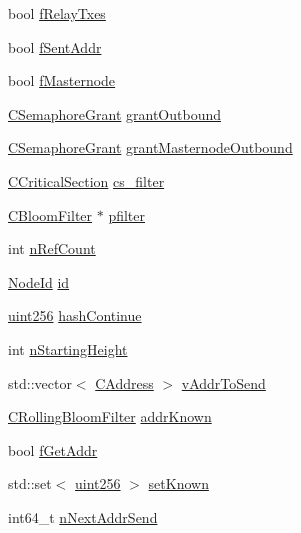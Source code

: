 \begin{DoxyCompactItemize}
bool \mbox{\hyperlink{class_c_node_ab387bb0c4ffd42e3f0aea233dca0e301}{f\+Relay\+Txes}}
\item 
bool \mbox{\hyperlink{class_c_node_aa8d520199b103410958ba9ce4412cf61}{f\+Sent\+Addr}}
\item 
bool \mbox{\hyperlink{class_c_node_a119824dcaebcd3c8e272a68f19a60c43}{f\+Masternode}}
\item 
\mbox{\hyperlink{class_c_semaphore_grant}{C\+Semaphore\+Grant}} \mbox{\hyperlink{class_c_node_a4bb25f8bdeeaff5e8cb08abc97bbc44d}{grant\+Outbound}}
\item 
\mbox{\hyperlink{class_c_semaphore_grant}{C\+Semaphore\+Grant}} \mbox{\hyperlink{class_c_node_a604bf0cdcd13ec51a2d81976ec33c531}{grant\+Masternode\+Outbound}}
\item 
\mbox{\hyperlink{sync_8h_a37a4692b2d517f2843655ca11af7668a}{C\+Critical\+Section}} \mbox{\hyperlink{class_c_node_a66aeed3b6534635d031dff3eee9538de}{cs\+\_\+filter}}
\item 
\mbox{\hyperlink{class_c_bloom_filter}{C\+Bloom\+Filter}} $\ast$ \mbox{\hyperlink{class_c_node_a2e28bf088e56fc9d30e99e9de6587743}{pfilter}}
\item 
int \mbox{\hyperlink{class_c_node_a01f8cac776bef676651f9b8f3f80ae98}{n\+Ref\+Count}}
\item 
\mbox{\hyperlink{net_8h_a954d746a58632565552615fd0a4ee660}{Node\+Id}} \mbox{\hyperlink{class_c_node_af99591c635f495fc1e6c14745a2a4203}{id}}
\item 
\mbox{\hyperlink{classuint256}{uint256}} \mbox{\hyperlink{class_c_node_a1a1c0d94de0197c5c4abf5a8d13364f3}{hash\+Continue}}
\item 
int \mbox{\hyperlink{class_c_node_a597b41bd64e2ac9391b7211e65aeb52a}{n\+Starting\+Height}}
\item 
std\+::vector$<$ \mbox{\hyperlink{class_c_address}{C\+Address}} $>$ \mbox{\hyperlink{class_c_node_a9b2d9b9182ff111c79f704594c4aa2e1}{v\+Addr\+To\+Send}}
\item 
\mbox{\hyperlink{class_c_rolling_bloom_filter}{C\+Rolling\+Bloom\+Filter}} \mbox{\hyperlink{class_c_node_a3f3a08b1a2c85b1c6cf975b2bdb53171}{addr\+Known}}
\item 
bool \mbox{\hyperlink{class_c_node_a3da9c559959e182aff8439cd004ff624}{f\+Get\+Addr}}
\item 
std\+::set$<$ \mbox{\hyperlink{classuint256}{uint256}} $>$ \mbox{\hyperlink{class_c_node_ab1b30fa8e48005752f6b0bcf43eca478}{set\+Known}}
\item 
int64\+\_\+t \mbox{\hyperlink{class_c_node_aff4b68eeeee9bf1e27e14f2436a07556}{n\+Next\+Addr\+Send}}

\end{DoxyCompactItemize}
